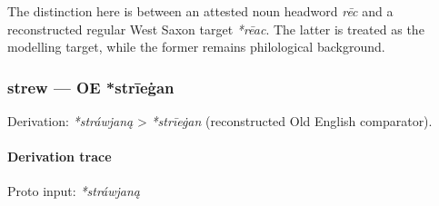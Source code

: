 \documentclass[
  british,
  a4paper,
]{article}
\begin{document}
The distinction here is between an attested noun headword \emph{rēc} and
a reconstructed regular West Saxon target \emph{*rēac}. The latter is
treated as the modelling target, while the former remains philological
background.

\subsubsection{strew --- OE *strīeġan}\label{strew-oe-strux12beux121an}

Derivation: \emph{*stráwjaną} \textgreater{} \emph{*strīeġan}
(reconstructed Old English comparator).

\paragraph{Derivation trace}\label{derivation-trace-69}

Proto input: \emph{*stráwjaną}

\begingroup
\setlength{\fboxsep}{6pt}
\end{document}
